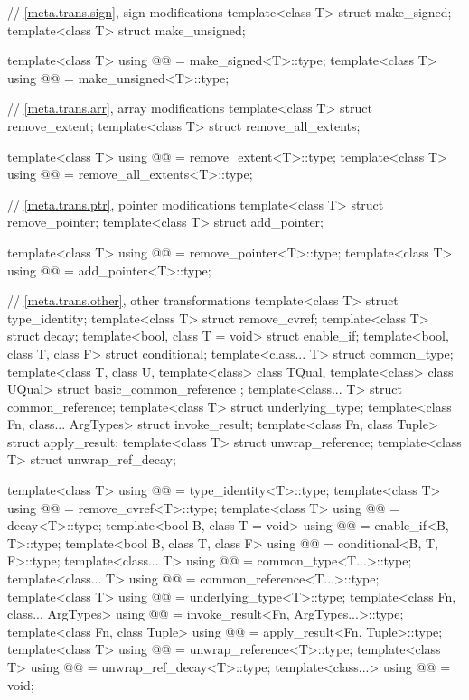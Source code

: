 \begin{codeblock}
{  // \ref{meta.trans.sign}, sign modifications
  template<class T> struct make_signed;
  template<class T> struct make_unsigned;

  template<class T>
    using @@   = make_signed<T>::type;
  template<class T>
    using @@ = make_unsigned<T>::type;

  // \ref{meta.trans.arr}, array modifications
  template<class T> struct remove_extent;
  template<class T> struct remove_all_extents;

  template<class T>
    using @@      = remove_extent<T>::type;
  template<class T>
    using @@ = remove_all_extents<T>::type;

  // \ref{meta.trans.ptr}, pointer modifications
  template<class T> struct remove_pointer;
  template<class T> struct add_pointer;

  template<class T>
    using @@ = remove_pointer<T>::type;
  template<class T>
    using @@    = add_pointer<T>::type;

  // \ref{meta.trans.other}, other transformations
  template<class T> struct type_identity;
  template<class T> struct remove_cvref;
  template<class T> struct decay;
  template<bool, class T = void> struct enable_if;
  template<bool, class T, class F> struct conditional;
  template<class... T> struct common_type;
  template<class T, class U, template<class> class TQual, template<class> class UQual>
    struct basic_common_reference { };
  template<class... T> struct common_reference;
  template<class T> struct underlying_type;
  template<class Fn, class... ArgTypes> struct invoke_result;
  template<class Fn, class Tuple> struct apply_result;
  template<class T> struct unwrap_reference;
  template<class T> struct unwrap_ref_decay;

  template<class T>
    using @@    = type_identity<T>::type;
  template<class T>
    using @@     = remove_cvref<T>::type;
  template<class T>
    using @@            = decay<T>::type;
  template<bool B, class T = void>
    using @@        = enable_if<B, T>::type;
  template<bool B, class T, class F>
    using @@      = conditional<B, T, F>::type;
  template<class... T>
    using @@      = common_type<T...>::type;
  template<class... T>
    using @@ = common_reference<T...>::type;
  template<class T>
    using @@  = underlying_type<T>::type;
  template<class Fn, class... ArgTypes>
    using @@    = invoke_result<Fn, ArgTypes...>::type;
  template<class Fn, class Tuple>
    using @@     = apply_result<Fn, Tuple>::type;
  template<class T>
    using @@ = unwrap_reference<T>::type;
  template<class T>
    using @@ = unwrap_ref_decay<T>::type;
  template<class...>
    using @@             = void;

}
\end{codeblock}

